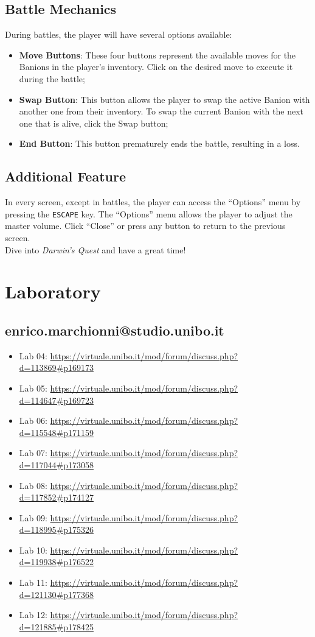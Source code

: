 \documentclass[12pt, a4paper]{report}
\theoremstyle{definition}
\begin{document}
\section{Battle Mechanics}
During battles, the player will have several options available:
\begin{itemize}
  \item \textbf{Move Buttons}: These four buttons represent the available moves for the Banions in the player's inventory. Click on the desired move to execute it during the battle;
  \item \textbf{Swap Button}: This button allows the player to swap the active Banion with another one from their inventory. To swap the current Banion with the next one that is alive, click the Swap button;
  \item \textbf{End Button}: This button prematurely ends the battle, resulting in a loss.
\end{itemize}

\section{Additional Feature}
In every screen, except in battles, the player can access the ``Options'' menu by pressing the \verb|ESCAPE| key.
The ``Options'' menu allows the player to adjust the master volume. Click ``Close'' or press any button to return to the previous screen.\\
Dive into \emph{Darwin's Quest} and have a great time!


\chapter{Laboratory}

\section{enrico.marchionni@studio.unibo.it}

\begin{itemize}
    \item Lab 04: \url{https://virtuale.unibo.it/mod/forum/discuss.php?d=113869#p169173}
    \item Lab 05: \url{https://virtuale.unibo.it/mod/forum/discuss.php?d=114647#p169723}
    \item Lab 06: \url{https://virtuale.unibo.it/mod/forum/discuss.php?d=115548#p171159}
    \item Lab 07: \url{https://virtuale.unibo.it/mod/forum/discuss.php?d=117044#p173058}
    \item Lab 08: \url{https://virtuale.unibo.it/mod/forum/discuss.php?d=117852#p174127}
    \item Lab 09: \url{https://virtuale.unibo.it/mod/forum/discuss.php?d=118995#p175326}
    \item Lab 10: \url{https://virtuale.unibo.it/mod/forum/discuss.php?d=119938#p176522}
    \item Lab 11: \url{https://virtuale.unibo.it/mod/forum/discuss.php?d=121130#p177368}
    \item Lab 12: \url{https://virtuale.unibo.it/mod/forum/discuss.php?d=121885#p178425}
\end{itemize}

\printbibliography
\end{document}
